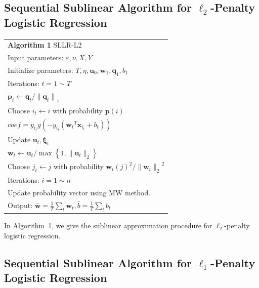 \documentclass{llncs}
\newcommand{\bw}{\mathbf{w}}
\newcommand{\bu}{\mathbf{u}}
\newcommand{\bp}{\mathbf{p}}
\newcommand{\bq}{\mathbf{q}}
\newcommand{\bxi}{\mathbf{\xi}}
\newcommand{\lc}{\left(}
\newcommand{\rc}{\right)}
\newcommand{\lj}{\lc j\rc}
\newcommand{\tspace}{\hspace*{2em}}
\begin{document}
\subsection{Sequential Sublinear Algorithm for $\ell_2$-Penalty Logistic Regression} \label{sec:l2alg}
	
	\begin{table} [ht]
	\begin{tabular}{l}
	\hline\noalign{\smallskip}
	\textbf{Algorithm 1} SLLR-L2 \\
	\noalign{\smallskip}
	\hline
	\noalign{\smallskip}
		Input parameters: $\varepsilon, \nu, X, Y$ \\
		Initialize parameters: $T, \eta, {\mathbf{u}}_{0}, {\bw}_{1}, {\mathbf{\bq}}_{1}, {b}_{1}$\\
		Iterations: $t=1 \sim T$ \\
		\tspace ${\bp}_{t}\leftarrow{\bq}_{t}/{\|{\bq}_{t}\|}_{1}$ \\
	    \tspace Choose ${i}_{t}\leftarrow i$ with probability $\bp(i)$ \\
		\tspace $coef={y}_{{i}_{t}}g\lc-{y}_{{i}_{t}}\lc {{\bw}_{t}}^{T}{\mathbf{x}}_{i_t}+{b}_{t} \rc\rc$ \\
		\tspace Update ${\bu}_{t}, {\bxi}_{t}$ \\
		\tspace ${\bw}_{t}\leftarrow {\bu}_{t}/\max \left\{1,\|{\bu}_{t}\|_2 \right\}$ \\
		\tspace Choose ${j}_{t}\leftarrow j$ with probability ${{\bw}_{t}\lj}^{2}/{\|{\bw}_{t}\|_2}^{2} $ \\
		\tspace Iterations: $i=1 \sim n$ \\
		\tspace\tspace Update probability vector using MW method. \\
		Output: $\bar{\bw}=\frac{1}{T}\sum_{t}{\bw}_{t},\bar{b}=\frac{1}{T}\sum_{t}{b}_{t}$ \\
	\hline
	\end{tabular} 	
	\label{alg:1}
	\end{table}

    In Algorithm~1, we give the sublinear approximation procedure for $\ell_2$-penalty logistic regression.	

\subsection{Sequential Sublinear Algorithm for $\ell_1$-Penalty Logistic Regression}
	
\end{document}
